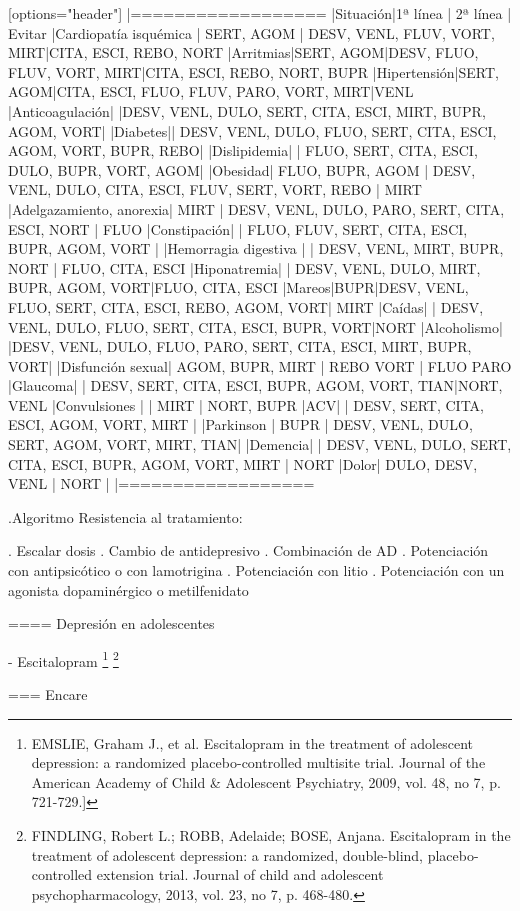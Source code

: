 [options="header"]
|==================
|Situación|1ª línea | 2ª línea | Evitar
|Cardiopatía isquémica | SERT, AGOM | DESV, VENL, FLUV, VORT, MIRT|CITA, ESCI, REBO, NORT
|Arritmias|SERT, AGOM|DESV, FLUO, FLUV, VORT, MIRT|CITA, ESCI, REBO, NORT, BUPR
|Hipertensión|SERT, AGOM|CITA, ESCI, FLUO, FLUV, PARO, VORT, MIRT|VENL
|Anticoagulación| |DESV, VENL, DULO, SERT, CITA, ESCI, MIRT, BUPR, AGOM, VORT|
|Diabetes|| DESV, VENL, DULO, FLUO, SERT, CITA, ESCI, AGOM, VORT, BUPR, REBO|
|Dislipidemia| | FLUO, SERT, CITA, ESCI, DULO, BUPR, VORT, AGOM|
|Obesidad| FLUO, BUPR, AGOM | DESV, VENL, DULO, CITA, ESCI, FLUV, SERT, VORT, REBO | MIRT
|Adelgazamiento, anorexia| MIRT | DESV, VENL, DULO, PARO, SERT, CITA, ESCI, NORT | FLUO
|Constipación| | FLUO, FLUV, SERT, CITA, ESCI, BUPR, AGOM, VORT |
|Hemorragia digestiva | | DESV, VENL, MIRT, BUPR, NORT | FLUO, CITA, ESCI
|Hiponatremia| | DESV, VENL, DULO, MIRT, BUPR, AGOM, VORT|FLUO, CITA, ESCI
|Mareos|BUPR|DESV, VENL, FLUO, SERT, CITA, ESCI, REBO, AGOM, VORT| MIRT
|Caídas| | DESV, VENL, DULO, FLUO, SERT, CITA, ESCI, BUPR, VORT|NORT
|Alcoholismo| |DESV, VENL, DULO, FLUO, PARO, SERT, CITA, ESCI, MIRT, BUPR, VORT|
|Disfunción sexual| AGOM, BUPR, MIRT | REBO VORT | FLUO PARO
|Glaucoma| | DESV, SERT, CITA, ESCI, BUPR, AGOM, VORT, TIAN|NORT, VENL
|Convulsiones | | MIRT | NORT, BUPR
|ACV| | DESV, SERT, CITA, ESCI, AGOM, VORT, MIRT |
|Parkinson | BUPR | DESV, VENL, DULO, SERT, AGOM, VORT, MIRT, TIAN|
|Demencia| | DESV, VENL, DULO, SERT, CITA, ESCI, BUPR, AGOM, VORT, MIRT | NORT
|Dolor| DULO, DESV, VENL | NORT |
|==================

.Algoritmo
Resistencia al tratamiento:

. Escalar dosis
. Cambio de antidepresivo
. Combinación de AD
. Potenciación con antipsicótico o con lamotrigina
. Potenciación con litio
. Potenciación con un agonista dopaminérgico o metilfenidato

==== Depresión en adolescentes

- Escitalopram \footnote{EMSLIE, Graham J., et al. Escitalopram in the treatment of adolescent depression: a randomized placebo-controlled multisite trial. Journal of the American Academy of Child \& Adolescent Psychiatry, 2009, vol. 48, no 7, p. 721-729.]} \footnote{FINDLING, Robert L.; ROBB, Adelaide; BOSE, Anjana. Escitalopram in the treatment of adolescent depression: a randomized, double-blind, placebo-controlled extension trial. Journal of child and adolescent psychopharmacology, 2013, vol. 23, no 7, p. 468-480.}

=== Encare

